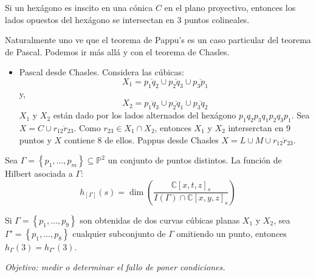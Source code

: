 \documentclass[12pt]{report}
\newcounter{it}
\theoremstyle{largebreak}
\begin{document}
    \begin{theor}
        Si un hexágono es inscito en una cónica $C$ en el plano proyectivo, entonces los lados opuestos del hexágono se intersectan en 3 puntos colineales.
    \end{theor}

    Naturalmente uno ve que el teorema de Pappu's es un caso particular del teorema de Pascal. Podemos ir más allá y con el teorema de Chasles.

    \begin{itemize}
        \item Pascal desde Chasles. Considera las cúbicas:
        \begin{equation*}
            X_1=\overline{p_1q_2}\cup\overline{p_2q_3}\cup\overline{p_3p_1}
        \end{equation*}
        y,
        \begin{equation*}
            X_2=\overline{p_1q_3}\cup\overline{p_2q_1}\cup\overline{p_3q_2}
        \end{equation*}
        $X_1$ y $X_2$ están dado por los lados alternados del hexágono $p_1q_2p_3q_1p_2q_3p_1$. Sea $X=C\cup\overline{r_{12}r_{23}}$. Como $r_{23}\in X_1\cap X_2$, entonces $X_1$ y $X_2$ interserctan en 9 puntos y $X$ contiene 8 de ellos.
        Pappus desde Chasles $X=L\cup M\cup\overline{r_{12}r_{23}}$.
    \end{itemize}

    Sea $\Gamma=\left\{p_1,...,p_m \right\}\subseteq\mathbb{P}^2$ un conjunto de puntos distintos. La función de Hilbert asociada a $\Gamma$:
    \begin{equation*}
        h_[\Gamma](s)=\dim\left(\frac{\mathbb{C}[x,t,z]_s}{I(\Gamma)\cap\mathbb{C}[x,y,z]_s} \right)
    \end{equation*}

    \begin{exa}
        Si $\Gamma=\left\{p_1,...,p_9 \right\}$ son obtenidas de dos curvas cúbicas planas $X_1$ y $X_2$, sea $\Gamma'=\left\{p_1,...,p_8 \right\}$ cualquier subconjunto de $\Gamma$ omitiendo un punto, entonces $h_\Gamma(3)=h_{\Gamma'}(3)$.
    \end{exa}

    \begin{center}
        \textit{Objetivo: medir o determinar el fallo de poner condiciones.}
    \end{center}
\end{document}
